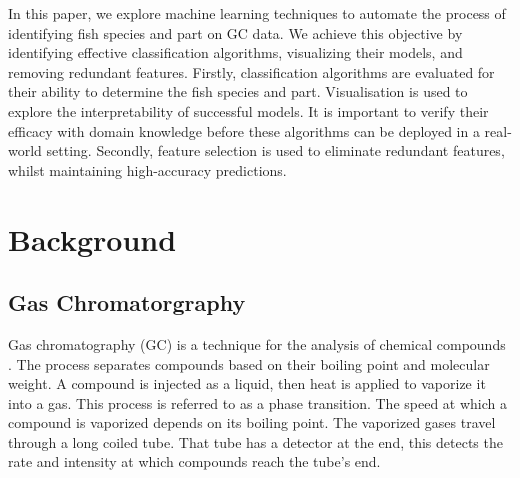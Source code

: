 \documentclass[runningheads]{llncs}
\begin{document}


In this paper, we explore machine learning techniques to automate the process of identifying fish species and part on GC data. 
We achieve this objective by identifying effective classification algorithms, visualizing their models, and removing redundant features. 
Firstly, classification algorithms are evaluated for their ability to determine the fish species and part. 
Visualisation is used to explore the interpretability of successful models.
It is important to verify their efficacy with domain knowledge before these algorithms can be deployed in a real-world setting.
Secondly, feature selection is used to eliminate redundant features, whilst maintaining high-accuracy predictions. 

\section{Background}
\label{background}

\subsection{Gas Chromatorgraphy}

Gas chromatography (GC) is a technique for the analysis of chemical compounds \cite{eder1995gas,restek2018high,khan2013gas}.
The process separates compounds based on their boiling point and molecular weight.
A compound is injected as a liquid, then heat is applied to vaporize it into a gas. 
This process is referred to as a phase transition. 
The speed at which a compound is vaporized depends on its boiling point. 
The vaporized gases travel through a long coiled tube.
That tube has a detector at the end, this detects the rate and intensity at which compounds reach the tube's end. 

\end{document}
